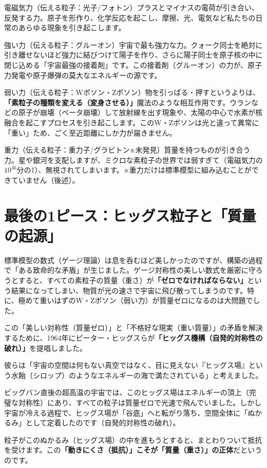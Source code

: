 電磁気力（伝える粒子：光子/フォトン）プラスとマイナスの電荷が引き合い、反発する力。原子を形作り、化学反応を起こし、摩擦、光、電気など私たちの日常のあらゆる現象を引き起こします。

強い力（伝える粒子：グルーオン）宇宙で最も強力な力。クォーク同士を絶対に引き離せないほど強力に結びつけて陽子を作り、さらに陽子同士を原子核の中に閉じ込める「宇宙最強の接着剤」です。この接着剤（グルーオン）の力が、原子力発電や原子爆弾の莫大なエネルギーの源です。

弱い力（伝える粒子：Wボソン・Zボソン）物を引っぱる・押すというよりは、\textbf{「素粒子の種類を変える（変身させる）」}魔法のような相互作用です。ウランなどの原子が崩壊（ベータ崩壊）して放射線を出す現象や、太陽の中心で水素が核融合を起こすプロセスを引き起こします。このW・Zボソンは光と違って異常に「重い」ため、ごく至近距離にしか力が届きません。

重力（伝える粒子：重力子/グラビトン※未発見）質量を持つものが引き合う力。星や銀河を支配しますが、ミクロな素粒子の世界では弱すぎて（電磁気力の\(10^{36}\)分の1）、無視されてしまいます。※重力だけは標準模型に組み込むことができていません（後述）。

\section{最後の1ピース：ヒッグス粒子と「質量の起源」}

標準模型の数式（ゲージ理論）は息を呑むほど美しかったのですが、構築の過程で「ある致命的な矛盾」が生じました。ゲージ対称性の美しい数式を厳密に守ろうとすると、すべての素粒子の質量（重さ）が\textbf{「ゼロでなければならない」}という結果になってしまい、物質が光の速さで宇宙に飛び散ってしまうのです。特に、極めて重いはずのW・Zボソン（弱い力）が質量ゼロになるのは大問題でした。

この「美しい対称性（質量ゼロ）」と「不格好な現実（重い質量）」の矛盾を解決するために、1964年にピーター・ヒッグスらが\textbf{「ヒッグス機構（自発的対称性の破れ）」}を提唱しました。

彼らは「宇宙の空間は何もない真空ではなく、目に見えない『ヒッグス場』という水飴（シロップ）のようなエネルギーの海で満たされている」と考えました。

ビッグバン直後の超高温の宇宙では、このヒッグス場はエネルギーの頂上（完璧な対称性）にあり、すべての粒子は質量ゼロで光速で飛んでいました。しかし宇宙が冷える過程で、ヒッグス場が「谷底」へと転がり落ち、空間全体に「ぬかるみ」として定着したのです（自発的対称性の破れ）。

粒子がこのぬかるみ（ヒッグス場）の中を進もうとすると、まとわりついて抵抗を受けます。この\textbf{「動きにくさ（抵抗）」こそが「質量（重さ）」の正体}だというのです。

